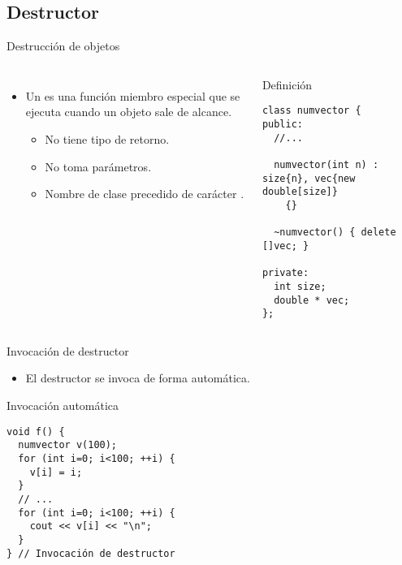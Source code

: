 \subsection{Destructor}

\begin{frame}[t,fragile]{Destrucción de objetos}
\begin{columns}[T]

\begin{itemize}
  \item Un  es una función miembro especial que se
        ejecuta  cuando un objeto sale de
        alcance.
    \begin{itemize}
      \item No tiene tipo de retorno.
      \item No toma parámetros.
      \item Nombre de clase precedido de carácter \textbf{\cppid{~}}.
    \end{itemize}
\end{itemize}


\begin{block}{Definición}
\begin{lstlisting}
class numvector {
public:
  //...

  numvector(int n) : size{n}, vec{new double[size]}
    {}

  ~numvector() { delete []vec; }

private:
  int size;
  double * vec;
};
\end{lstlisting}
\end{block}

\end{columns}
\end{frame}

\begin{frame}[t,fragile]{Invocación de destructor}
\begin{itemize}
  \item El destructor se invoca de forma automática.
\end{itemize}

\begin{block}{Invocación automática}
\begin{lstlisting}
void f() {
  numvector v(100);
  for (int i=0; i<100; ++i) {
    v[i] = i;
  }
  // ...
  for (int i=0; i<100; ++i) {
    cout << v[i] << "\n";
  }
} // Invocación de destructor
\end{lstlisting}
\end{block}
\end{frame}

